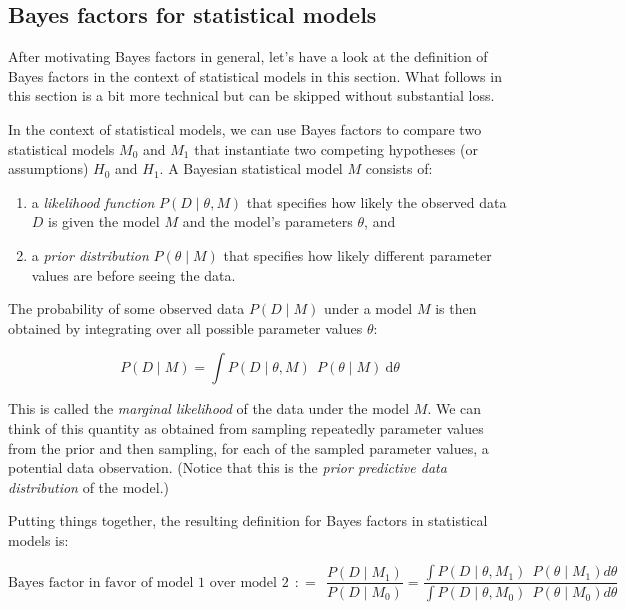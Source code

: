 \documentclass[
  doc,
  floatsintext,
  longtable,
  nolmodern,
  notxfonts,
  notimes,
  colorlinks=true,linkcolor=blue,citecolor=blue,urlcolor=blue]{apa7}
\providecommand{\tightlist}{%
  \setlength{\itemsep}{0pt}\setlength{\parskip}{0pt}}
\begin{document}
\subsection{Bayes factors for statistical
models}\label{bayes-factors-for-statistical-models}

After motivating Bayes factors in general, let's have a look at the
definition of Bayes factors in the context of statistical models in this
section. What follows in this section is a bit more technical but can be
skipped without substantial loss.

In the context of statistical models, we can use Bayes factors to
compare two statistical models \(M_0\) and \(M_1\) that instantiate two
competing hypotheses (or assumptions) \(H_0\) and \(H_1\). A Bayesian
statistical model \(M\) consists of:

\begin{enumerate}
\def\labelenumi{\arabic{enumi}.}
\tightlist
\item
  a \emph{likelihood function} \(P(D \mid \theta, M)\) that specifies
  how likely the observed data \(D\) is given the model \(M\) and the
  model's parameters \(\theta\), and
\item
  a \emph{prior distribution} \(P(\theta \mid M)\) that specifies how
  likely different parameter values are before seeing the data.
\end{enumerate}

The probability of some observed data \(P(D \mid M)\) under a model
\(M\) is then obtained by integrating over all possible parameter values
\(\theta\):

\[
P(D \mid M) = \int P(D \mid \theta, M) \ \  P(\theta \mid M) \ \text{d} \theta
\]

This is called the \emph{marginal likelihood} of the data under the
model \(M\). We can think of this quantity as obtained from sampling
repeatedly parameter values from the prior and then sampling, for each
of the sampled parameter values, a potential data observation. (Notice
that this is the \emph{prior predictive data distribution} of the
model.)

Putting things together, the resulting definition for Bayes factors in
statistical models is:

\[
\text{Bayes factor in favor of model 1 over model 2} \ \  \colon\!= \ \ \frac{P(D \mid M_1)}{P(D \mid M_0)} = \frac{\int P(D \mid \theta, M_1) \ \  P(\theta \mid M_1) d\theta}{\int P(D \mid \theta, M_0) \ \  P(\theta \mid M_0) d\theta}
\]
\end{document}

